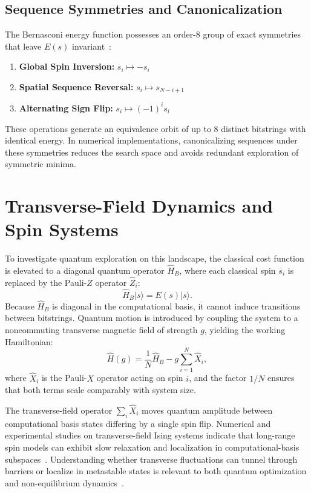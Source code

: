 \documentclass[12pt,a4paper]{report}
\begin{document}
\subsection{Sequence Symmetries and Canonicalization}
The Bernasconi energy function possesses an order-$8$ group of exact symmetries that leave $E(s)$ invariant~\cite{packebusch2016}:
\begin{enumerate}
    \item \textbf{Global Spin Inversion:} $s_i \mapsto -s_i$
    \item \textbf{Spatial Sequence Reversal:} $s_i \mapsto s_{N-i+1}$
    \item \textbf{Alternating Sign Flip:} $s_i \mapsto (-1)^i s_i$
\end{enumerate}
These operations generate an equivalence orbit of up to $8$ distinct bitstrings with identical energy. In numerical implementations, canonicalizing sequences under these symmetries reduces the search space and avoids redundant exploration of symmetric minima.

\section{Transverse-Field Dynamics and Spin Systems}
\label{sec:transverse_field_dynamics}
To investigate quantum exploration on this landscape, the classical cost function is elevated to a diagonal quantum operator $\hat{H}_B$, where each classical spin $s_i$ is replaced by the Pauli-$Z$ operator $\hat{Z}_i$:
\begin{equation}
    \hat{H}_B |s\rangle = E(s)|s\rangle.
\end{equation}
Because $\hat{H}_B$ is diagonal in the computational basis, it cannot induce transitions between bitstrings. Quantum motion is introduced by coupling the system to a noncommuting transverse magnetic field of strength $g$, yielding the working Hamiltonian:
\begin{equation}
    \hat{H}(g) = \frac{1}{N}\hat{H}_B - g \sum_{i=1}^N \hat{X}_i,
    \label{eq:transverse_hamiltonian}
\end{equation}
where $\hat{X}_i$ is the Pauli-$X$ operator acting on spin $i$, and the factor $1/N$ ensures that both terms scale comparably with system size.

The transverse-field operator $\sum_i \hat{X}_i$ moves quantum amplitude between computational basis states differing by a single spin flip. Numerical and experimental studies on transverse-field Ising systems indicate that long-range spin models can exhibit slow relaxation and localization in computational-basis subspaces~\cite{mohtashim2025, smelyanskiy2020}. Understanding whether transverse fluctuations can tunnel through barriers or localize in metastable states is relevant to both quantum optimization and non-equilibrium dynamics~\cite{battaglia2005, brady2016, crosson2016, denchev2016}.
\end{document}
